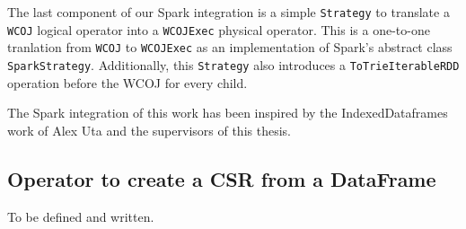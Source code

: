 The last component of our Spark integration is a simple \texttt{Strategy} to translate a \texttt{WCOJ} logical operator into a
\texttt{WCOJExec} physical operator.
This is a one-to-one tranlation from \texttt{WCOJ} to \texttt{WCOJExec} as an implementation of Spark's abstract class
\texttt{SparkStrategy}.
Additionally, this \texttt{Strategy} also introduces a \texttt{ToTrieIterableRDD} operation before the WCOJ for every child.

The Spark integration of this work has been inspired by the IndexedDataframes~\cite{indexed-dataframes} work of Alex Uta and the supervisors
of this thesis.

\subsection{Operator to create a CSR from a DataFrame}\label{subsec:csr-spark}
To be defined and written.

